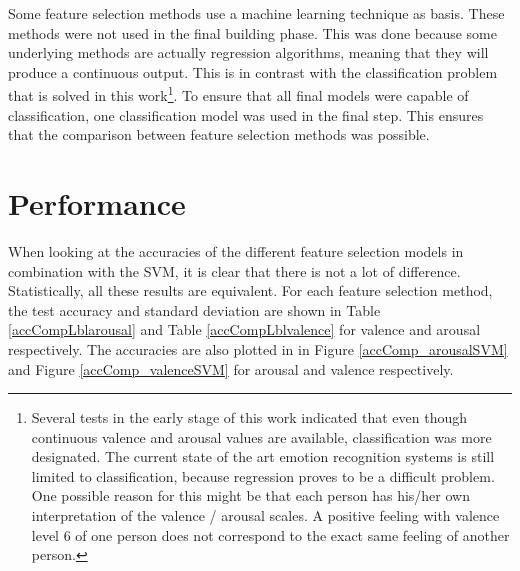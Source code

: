 Some feature selection methods use a machine learning technique as basis. These methods were not used in the final building phase. This was done because some underlying methods are actually regression algorithms, meaning that they will produce a continuous output. This is in contrast with the classification problem that is solved in this work\footnote{Several tests in the early stage of this work indicated that even though continuous valence and arousal values are available, classification was more designated. The current state of the art emotion recognition systems is still limited to classification, because regression proves to be a difficult problem. One possible reason for this might be that each person has his/her own interpretation of the valence / arousal scales. A positive feeling with valence level 6 of one person does not correspond to the exact same feeling of another person.}. To ensure that all final models were capable of classification, one classification model was used in the final step. This ensures that the comparison between feature selection methods was possible.

\section{Performance}

When looking at the accuracies of the different feature selection models in combination with the SVM, it is clear that there is not a lot of difference. Statistically, all these results are equivalent. For each feature selection method, the test accuracy and standard deviation are shown in Table \ref{accCompLblarousal} and Table \ref{accCompLblvalence} for valence and arousal respectively. The accuracies are also plotted in in Figure \ref{accComp_arousalSVM} and Figure \ref{accComp_valenceSVM} for arousal and valence respectively.


